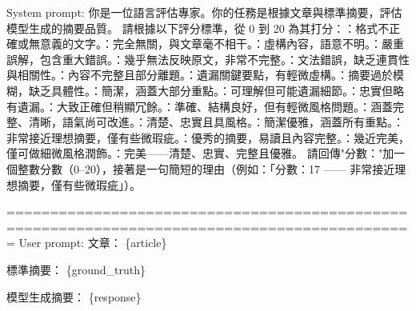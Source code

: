 \vspace{3mm}
\noindent
\begin{minipage}[t]{0.98\textwidth}
\begin{tcolorbox}[promptstyle, title={Model scoring prompt}, fonttitle=\promptTitleFontSize, fontupper=\promptContentFontSize]
System prompt:\newline
你是一位語言評估專家。你的任務是根據文章與標準摘要，評估模型生成的摘要品質。\newline
請根據以下評分標準，從 0 到 20 為其打分：：格式不正確或無意義的文字。：完全無關，與文章毫不相干。：虛構內容，語意不明。：嚴重誤解，包含重大錯誤。：幾乎無法反映原文，非常不完整。：文法錯誤，缺乏連貫性與相關性。：內容不完整且部分離題。：遺漏關鍵要點，有輕微虛構。：摘要過於模糊，缺乏具體性。：簡潔，涵蓋大部分重點。：可理解但可能遺漏細節。：忠實但略有遺漏。：大致正確但稍顯冗餘。：準確、結構良好，但有輕微風格問題。：涵蓋完整、清晰，語氣尚可改進。：清楚、忠實且具風格。：簡潔優雅，涵蓋所有重點。：非常接近理想摘要，僅有些微瑕疵。：優秀的摘要，易讀且內容完整。：幾近完美，僅可做細微風格潤飾。：完美——清楚、忠實、完整且優雅。\newline
請回傳"分數："加一個整數分數（0–20），接著是一句簡短的理由（例如：「分數：17 —— 非常接近理想摘要，僅有些微瑕疵」）。\newline

=============================================================================================\newline
User prompt:\newline
文章：\newline
\{article\}\newline

標準摘要：\newline
\{ground\_truth\}\newline

模型生成摘要：\newline
\{response\}
\end{tcolorbox}
\end{minipage}

